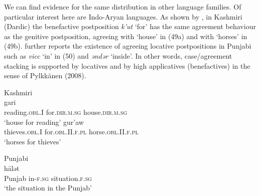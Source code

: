 \documentclass[output=paper]{langsci/langscibook}
\begin{document}
We can find evidence for the same distribution in other language families. Of particular interest here are Indo-Aryan languages. As shown by \citet{Payne1995}, in Kashmiri (Dardic) the benefactive postposition \textit{k’ut} ‘for’ has the same agreement behaviour as the genitive postposition, agreeing with ‘house’ in (49a) and with ‘horses’ in (49b). \citet{Payne1995} further reports the existence of agreeing locative postpositions in Punjabi such as \textit{vicc} ‘in’ in (50) and \textit{ənd}\textit{ər} ‘inside’. In other words, case/agreement stacking is supported by locatives and by high applicatives (benefactives) in the sense of Pylkkänen (2008).

\ea%
    Kashmiri \citep[293]{Payne1995}\label{ex:manzini:49}\\
    \ea
    \gll\relax [paranas     k'ut]     gari \\
         reading.\textsc{obl}.I   for.\textsc{dir.m.sg}  house.\textsc{dir.m.sg}\\
    \glt ‘house for reading’  
    \ex  
    \gll\relax [cur'an     k'it'aw]     gur'aw\\
         thieves.\textsc{obl}.I   for.\textsc{obl}.II.\textsc{f.pl}   horse.\textsc{obl.II.f.pl}\\
    \glt ‘horses for thieves’
    \z
\z

          

    

\ea%
         Punjabi \citep[289]{Payne1995}\label{ex:manzini:50}\\
    \gll [pənj\=ab  vicl-\=\i]    h\=alət        \\
         Punjab   in-\textsc{f.sg}  situation.\textsc{f.sg}\\
    \glt ‘the situation in the Punjab’ 
    \z
\end{document}
